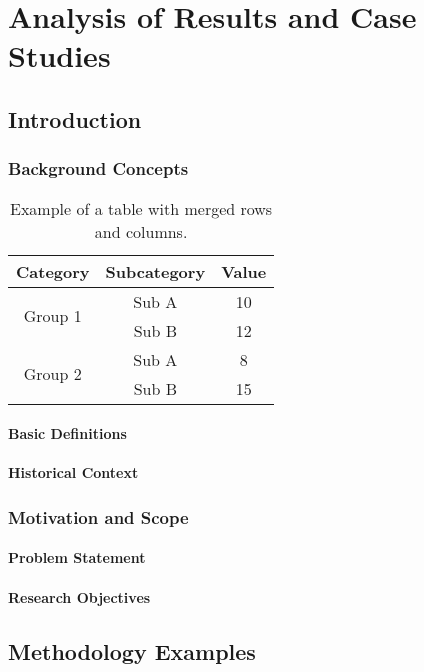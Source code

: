 \chapter{Analysis of Results and Case Studies} \label{CH3}
\section{Introduction }
\lipsum[1-3]
\subsection{Background Concepts}
\lipsum[1]
\begin{table}[h!]
	\centering
	\caption{Example of a table with merged rows and columns.}
	\small
	\begin{tabular}{|c|c|c|}
		\hline
		\textbf{Category} & \textbf{Subcategory} & \textbf{Value} \\ \hline
		\multirow{2}{*}{Group 1} & Sub A & 10 \\ \cline{2-3}
		& Sub B & 12 \\ \hline
		\multirow{2}{*}{Group 2} & Sub A & 8 \\ \cline{2-3}
		& Sub B & 15 \\ \hline
	\end{tabular}
	\label{tab:merged}
\end{table}
\subsubsection{Basic Definitions}
\subsubsection{Historical Context}

\subsection{Motivation and Scope}
\subsubsection{Problem Statement}
\subsubsection{Research Objectives}

\section{Methodology Examples}
\lipsum[1]
